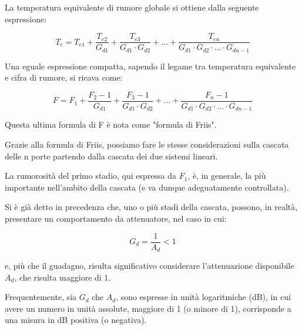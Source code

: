 La temperatura equivalente di rumore globale si ottiene dalla seguente espressione: 

{
    \Large 
    \begin{equation}
        T_e 
        = 
        T_{e1}
        + 
        \frac{T_{e2}}{G_{d1}}
        + 
        \frac{T_{e3}}{G_{d1} \cdot G_{d2}}
        + 
        \dots
        +
        \frac{T_{en}}{G_{d1} \cdot G_{d2} \cdot \dots \cdot G_{dn-1}}
    \end{equation}
}

Una eguale espressione compatta, sapendo il legame tra temperatura equivalente e cifra di rumore, si ricava come: 

{
    \Large 
    \begin{equation}
        F 
        = 
        F_{1}
        + 
        \frac{F_{2} - 1}{G_{d1}}
        + 
        \frac{F_{3} - 1}{G_{d1} \cdot G_{d2}}
        + 
        \dots
        +
        \frac{F_{n} - 1}{G_{d1} \cdot G_{d2} \cdot \dots \cdot G_{dn-1}}
    \end{equation}
}

Questa ultima formula di F è nota come "formula di Friis". \newline 

Grazie alla formula di Friis, possiamo fare le stesse considerazioni sulla cascata delle n porte partendo dalla cascata dei due sistemi lineari. \newline 

La rumorosità del primo stadio, qui espressa da $F_1$, è, in generale, la più importante nell'ambito della cascata (e va dunque adeguatamente controllata). \newline 

Si è già detto in precedenza che, uno o più stadi della cascata, possono, in realtà, presentare un comportamento da attenuatore, nel caso in cui: 

{
    \Large 
    \begin{equation}
        G_d = \frac{1}{A_d}  < 1
    \end{equation}
}

e, più che il guadagno, risulta significativo considerare l'attenuazione disponibile $A_d$, che risulta maggiore di 1. \newline 

Frequentemente, sia $G_d$ che $A_d$, sono espresse in unità logaritmiche (dB), in cui avere un numero 
in unità assolute, maggiore di 1 (o minore di 1), corrisponde a una misura in dB positiva (o negativa). \newline 

